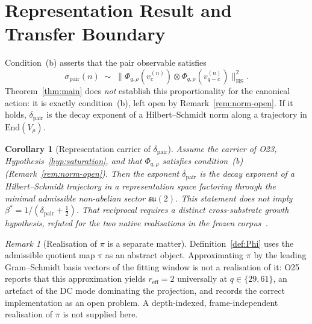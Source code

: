 \documentclass[11pt,a4paper]{article}
\newtheorem{corollary}[theorem]{Corollary}
\theoremstyle{remark}
\newtheorem{remark}[theorem]{Remark}
\begin{document}
  \section{Representation Result and Transfer Boundary}
  \label{sec:chain}

  Condition~(b) asserts that the pair observable satisfies
  \[
    \sigma_{\mathrm{pair}}(n) \;\sim\; \|\Phi_{q,\rho}(v^{(n)}_c) \otimes
    \Phi_{q,\rho}(v^{(n)}_{q-c})\|^2_{\mathrm{HS}} .
  \]
  Theorem~\ref{thm:main} does \emph{not} establish this proportionality for the canonical action:
  it is exactly condition~(b), left open by Remark~\ref{rem:norm-open}.
  If it holds, $\delta_{\mathrm{pair}}$ is the decay exponent of a Hilbert--Schmidt norm along a
  trajectory in $\mathrm{End}(V_\rho)$.

  \begin{corollary}[Representation carrier of $\delta_{\mathrm{pair}}$]
    \label{cor:beta}
    Assume the carrier of O23, Hypothesis~\ref{hyp:saturation}, and that $\Phi_{q,\rho}$
    satisfies condition~(b) (Remark~\ref{rem:norm-open}).
    Then the exponent $\delta_{\mathrm{pair}}$ is the decay exponent of a Hilbert--Schmidt
    trajectory in a representation space factoring through the minimal admissible
    non-abelian sector $\mathfrak{su}(2)$.
    This statement does not imply $\beta^*=1/(\delta_{\mathrm{pair}}+\tfrac12)$.
    That reciprocal requires a distinct cross-substrate growth hypothesis, refuted for the
    two native realisations in the frozen corpus~\cite{Beau2026sgn}.
  \end{corollary}

  \begin{remark}[Realisation of $\pi$ is a separate matter]
    \label{rem:pi-realisation}
    Definition~\ref{def:Phi} uses the admissible quotient map $\pi$ as an abstract object.
    Approximating $\pi$ by the leading Gram--Schmidt basis vectors of the fitting window is not a
    realisation of it: O25~\cite{Beau2026a29} reports that this approximation yields
    $r_{\mathrm{eff}} = 2$ universally at $q \in \{29, 61\}$, an artefact of the DC mode dominating
    the projection, and records the correct implementation as an open problem.
    A depth-indexed, frame-independent realisation of $\pi$ is not supplied here.
  \end{remark}
\end{document}
